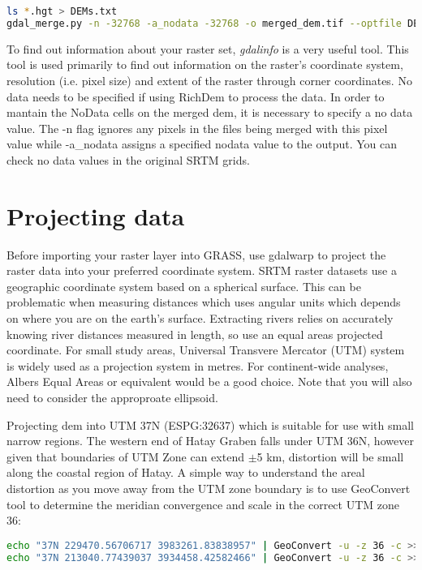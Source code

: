 \begin{lstlisting}[language=bash]
ls *.hgt > DEMs.txt
gdal_merge.py -n -32768 -a_nodata -32768 -o merged_dem.tif --optfile DEMs.txt
\end{lstlisting}

To find out information about your raster set, \textit{gdalinfo} is a very useful tool. This tool is used primarily to find out information on the raster’s coordinate system, resolution (i.e. pixel size) and extent of the raster through corner coordinates. No data needs to be specified if using RichDem to process the data. In order to mantain the NoData cells on the merged dem, it is necessary to specify a no data value. The -n flag ignores any pixels in the files being merged with this pixel value while -a_nodata assigns a specified nodata value to the output. You can check no data values in the original SRTM grids. 

\section{Projecting data}

Before importing your raster layer into GRASS, use gdalwarp to project the raster data into your preferred coordinate system. SRTM raster datasets use a geographic coordinate system based on a spherical surface. This can be problematic when measuring distances which uses angular units which depends on where you are on the earth’s surface. Extracting rivers relies on accurately knowing river distances measured in length, so use an equal areas projected coordinate. For small study areas, Universal Transvere Mercator (UTM) system is widely used as a projection system in metres. For continent-wide analyses, Albers Equal Areas or equivalent would be a good choice. Note that you will also need to consider the approproate ellipsoid. 

Projecting dem into UTM 37N (ESPG:32637) which is suitable for use with small narrow regions. The western end of Hatay Graben falls under UTM 36N, however given that boundaries of UTM Zone can extend ${\pm}$5 km, distortion will be small along the coastal region of Hatay. A simple way to understand the areal distortion as you move away from the UTM zone boundary is to use GeoConvert tool to determine the meridian convergence and scale in the correct UTM zone 36:

\begin{lstlisting}[language=bash]
echo "37N 229470.56706717 3983261.83838957" | GeoConvert -u -z 36 -c >> 1.76284 1.0005024
echo "37N 213040.77439037 3934458.42582466" | GeoConvert -u -z 36 -c >> 1.64826 1.0004153
\end{lstlisting}

